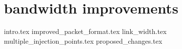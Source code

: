 \chapter{\confignoc{} bandwidth improvements}
\label{ch:5}
{intro.tex}
{improved_packet_format.tex}
{link_width.tex}
{multiple_injection_points.tex}
{proposed_changes.tex}